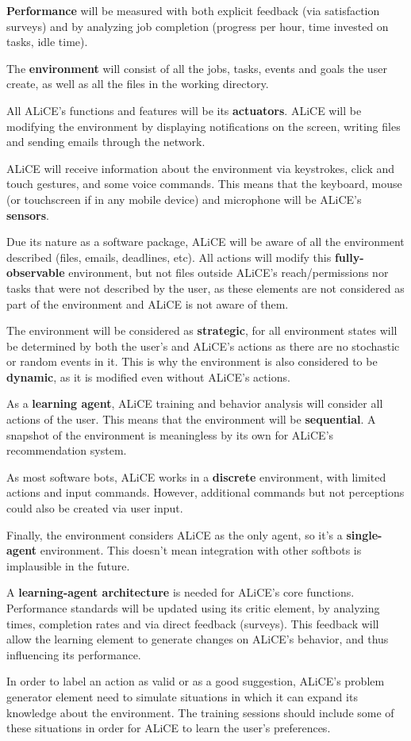 \documentclass[titlepage, letterpaper, fleqn]{article}
\begin{document}
\textbf{Performance} will be measured with both explicit feedback (via satisfaction surveys) and by analyzing job completion (progress per hour, time invested on tasks, idle time).

The \textbf{environment} will consist of all the jobs, tasks, events and goals the user create, as well as all the files in the working directory.

All ALiCE's functions and features will be its \textbf{actuators}. ALiCE will be modifying the environment by displaying notifications on the screen, writing files and sending emails through the network.

ALiCE will receive information about the environment via keystrokes, click and touch gestures, and some voice commands. This means that the keyboard, mouse (or touchscreen if in any mobile device) and microphone will be ALiCE's \textbf{sensors}.

Due its nature as a software package, ALiCE will be aware of all the environment described (files, emails, deadlines, etc).
All actions will modify this \textbf{fully-observable} environment, but not files outside ALiCE's reach/permissions nor tasks that were not described by the user, as these elements are not considered as part of the environment and ALiCE is not aware of them.

The environment will be considered as \textbf{strategic}, for all environment states will be determined by both the user's and ALiCE's actions as there are no stochastic or random events in it.
This is why the environment is also considered to be \textbf{dynamic}, as it is modified even without ALiCE's actions.

As a \textbf{learning agent}, ALiCE training and behavior analysis will consider all actions of the user.
This means that the environment will be \textbf{sequential}. A snapshot of the environment is meaningless by its own for ALiCE's recommendation system.

As most software bots, ALiCE works in a \textbf{discrete} environment, with limited actions and input commands. However, additional commands but not perceptions could also be created via user input.

Finally, the environment considers ALiCE as the only agent, so it's a \textbf{single-agent} environment.
This doesn't mean integration with other softbots is implausible in the future.

A \textbf{learning-agent architecture} is needed for ALiCE's core functions.
Performance standards will be updated using its critic element, by analyzing times, completion rates and via direct feedback (surveys).
This feedback will allow the learning element to generate changes on ALiCE's behavior, and thus influencing its performance.

In order to label an action as valid or as a good suggestion, ALiCE's problem generator element need to simulate situations in which it can expand its knowledge about the environment. The training sessions should include some of these situations in order for ALiCE to learn the user's preferences.


\end{document}
